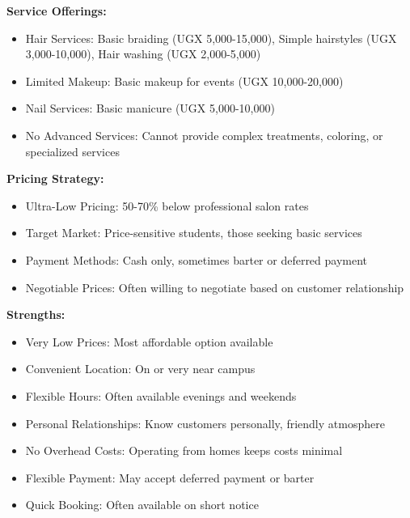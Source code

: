 \textbf{Service Offerings:}
\begin{itemize}[leftmargin=2em]
    \item Hair Services: Basic braiding (UGX 5,000-15,000), Simple hairstyles (UGX 3,000-10,000), Hair washing (UGX 2,000-5,000)
    \item Limited Makeup: Basic makeup for events (UGX 10,000-20,000)
    \item Nail Services: Basic manicure (UGX 5,000-10,000)
    \item No Advanced Services: Cannot provide complex treatments, coloring, or specialized services
\end{itemize}

\textbf{Pricing Strategy:}
\begin{itemize}[leftmargin=2em]
    \item Ultra-Low Pricing: 50-70\% below professional salon rates
    \item Target Market: Price-sensitive students, those seeking basic services
    \item Payment Methods: Cash only, sometimes barter or deferred payment
    \item Negotiable Prices: Often willing to negotiate based on customer relationship
\end{itemize}

\textbf{Strengths:}
\begin{itemize}[leftmargin=2em]
    \item Very Low Prices: Most affordable option available
    \item Convenient Location: On or very near campus
    \item Flexible Hours: Often available evenings and weekends
    \item Personal Relationships: Know customers personally, friendly atmosphere
    \item No Overhead Costs: Operating from homes keeps costs minimal
    \item Flexible Payment: May accept deferred payment or barter
    \item Quick Booking: Often available on short notice
\end{itemize}

